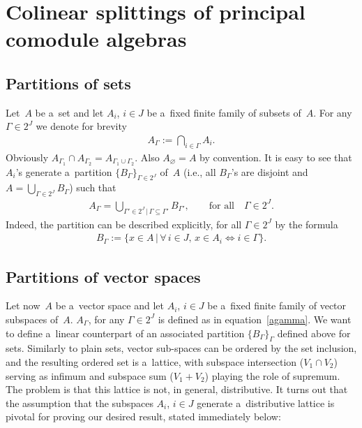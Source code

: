 \documentclass[11pt]{article}
\begin{document}
\section{Colinear splittings of principal comodule algebras}\label{partitions-s}

\subsection{Partitions of sets}

Let~$A$ be a~set and let $A_i$, $i\in J$ be a~f\/ixed f\/inite family of subsets of~$A$.
For any $\Gamma\in 2^J$ we denote for brevity
\begin{gather}
\label{agamma}
A_\Gamma:=\bigcap_{i\in \Gamma}A_i.
\end{gather}
Obviously $A_{\Gamma_1}\cap A_{\Gamma_2}=A_{\Gamma_1\cup\Gamma_2}$.
Also $A_\varnothing = A$ by convention.
It is easy to see that $A_i$'s generate a~partition $\{B_\Gamma\}_{\Gamma\in 2^J}$ of~$A$ (i.e., all $B_\Gamma$'s are
disjoint and $A=\bigcup_{\Gamma\in2^J}B_\Gamma$) such that
\begin{gather*}
A_\Gamma=\bigcup_{\Gamma'\in2^J
\,| \,
\Gamma\subseteq\Gamma'}B_{\Gamma'},
\qquad
\text{for all}
\quad
\Gamma\in 2^J.
\end{gather*}
Indeed, the partition can be described explicitly, for all $\Gamma\in2^J$ by the formula
\begin{gather*}
B_\Gamma
:=\{x\in A
\,|\,
\forall\, i\in J,\,
x\in A_i\Leftrightarrow i\in \Gamma\}.
\end{gather*}

\subsection{Partitions of vector spaces}

Let now~$A$ be a~vector space and let $A_i$, $i\in J$ be a~f\/ixed f\/inite family of vector subspaces of~$A$.
$A_\Gamma$, for any $\Gamma\in 2^J$ is def\/ined as in equation~\eqref{agamma}.
We want to def\/ine a~linear counterpart of an associated partition $\{B_\Gamma\}_\Gamma$ def\/ined above for sets.
Similarly to plain sets, vector sub-spaces can be ordered by the set inclusion, and the resulting ordered set is
a~lattice, with subspace intersection ($V_1\cap V_2$) serving as inf\/imum and subspace sum ($V_1+V_2$) playing the role
of supremum.
The problem is that this lattice is not, in general, distributive.
It turns out that the assumption that the subspaces $A_i$, $i\in J$ generate a~distributive lattice is pivotal for
proving our desired result, stated immediately below:
\end{document}
